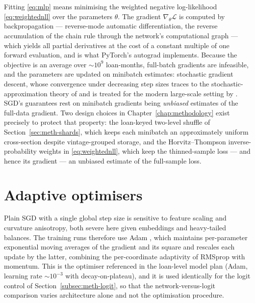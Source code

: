 Fitting \eqref{eq:mlp} means minimising the weighted negative
log-likelihood \eqref{eq:weightednll} over the parameters $\theta$.
The gradient $\nabla_\theta\widehat{\mathcal L}$ is computed by
backpropagation --- reverse-mode automatic differentiation, the
reverse accumulation of the chain rule through the network's
computational graph \citep{rumelhart1986} --- which yields all partial
derivatives at the cost of a constant multiple of one forward
evaluation, and is what PyTorch's autograd implements. Because the
objective is an average over $\sim$$10^{9}$ loan-months, full-batch
gradients are infeasible, and the parameters are updated on minibatch
estimates: stochastic gradient descent, whose convergence under
decreasing step sizes traces to the stochastic-approximation theory of
\citet{robbins1951} and is treated for the modern large-scale setting
by \citet{bottou2018}. SGD's guarantees rest on minibatch gradients
being \emph{unbiased} estimates of the full-data gradient. Two design
choices in Chapter~\ref{chap:methodology} exist precisely to protect
that property: the loan-keyed two-level shuffle of
Section~\ref{sec:meth-shards}, which keeps each minibatch an
approximately uniform cross-section despite vintage-grouped storage,
and the Horvitz--Thompson inverse-probability weights in
\eqref{eq:weightednll}, which keep the thinned-sample loss --- and
hence its gradient --- an unbiased estimate of the full-sample loss.

\section{Adaptive optimisers}
\label{sec:dlf-adam}

Plain SGD with a single global step size is sensitive to feature
scaling and curvature anisotropy, both severe here given embeddings and
heavy-tailed balances. The training runs therefore use Adam
\citep{kingma2015}, which maintains per-parameter exponential moving
averages of the gradient and its square and rescales each update by the
latter, combining the per-coordinate adaptivity of RMSprop
\citep{tieleman2012} with momentum. This is the optimiser referenced in
the loan-level model plan (Adam, learning rate $\sim$$10^{-3}$ with
decay-on-plateau), and it is used identically for the logit control of
Section~\ref{subsec:meth-logit}, so that the network-versus-logit
comparison varies architecture alone and not the optimisation
procedure.

